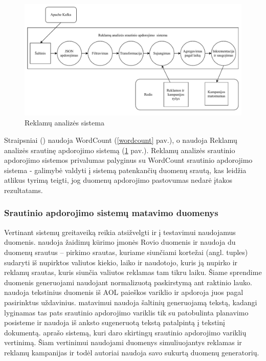 \documentclass{VUMIFPSbakalaurinis}
\begin{document}
\begin{figure}[H]
    \includegraphics[width=15cm]{img/yahoo.pdf}
    \caption{Reklamų analizės sistema \cite{Chintapalli2016Benchmarking}}
    \label{yahoo}
\end{figure} 

Straipsniai (\cite{Qian2016Benchmarking, huang2010hibench, dhalion}) naudoja WordCount (\ref{wordcount} pav.), o \cite{Chintapalli2016Benchmarking, vaquero2018autotuning} naudoja Reklamų analizės srautinę apdorojimo sistemą (\ref{yahoo} pav.). Reklamų analizės srautinio apdorojimo sistemos privalumas palyginus su WordCount srautinio apdorojimo sistema - galimybė valdyti į sistemą patenkančių duomenų srautą, kas leidžia atlikus tyrimą teigti, jog duomenų apdorojimo pastovumas nedarė įtakos rezultatams.

\subsubsection{Srautinio apdorojimo sistemų matavimo duomenys}

Vertinant sistemų greitaveiką reikia atsižvelgti ir į testavimui naudojamus duomenis. \cite{Karimov2018BenchmarkingDS} naudoja žaidimų kūrimo įmonės Rovio duomenis ir naudoja du duomenų srautus – pirkimo srautas, kuriame siunčiami kortežai (angl. tuples) sudaryti iš nupirktos valiutos kiekio, laiko ir naudotojo, kuris ją nupirko ir reklamų srautas, kuris siunčia valiutos reklamas tam tikru laiku. Šiame sprendime duomenis generuojami naudojant normalizuotą paskirstymą ant raktinio lauko. \cite{Qian2016Benchmarking} naudoja tekstinius duomenis iš AOL paieškos variklio ir apdoroja juos pagal pasirinktus uždavinius. \cite{zhang2020heron} matavimui naudoja šaltinių generuojamą tekstą, kadangi lyginamas tas pats srautinio apdorojimo variklis tik su patobulinta planavimo posisteme ir naudoja iš anksto sugeneruotą tekstą patalpintą į tekstinį dokumentą. \cite{Chintapalli2016Benchmarking} aprašo sistemą, kuri daro skirtingų srautinio apdorojimo variklių vertinimą. Šiam vertinimui naudojami duomenys simuliuojantys reklamas ir reklamų kampanijas ir todėl autoriai naudoja savo sukurtą duomenų generatorių. 
\end{document}
